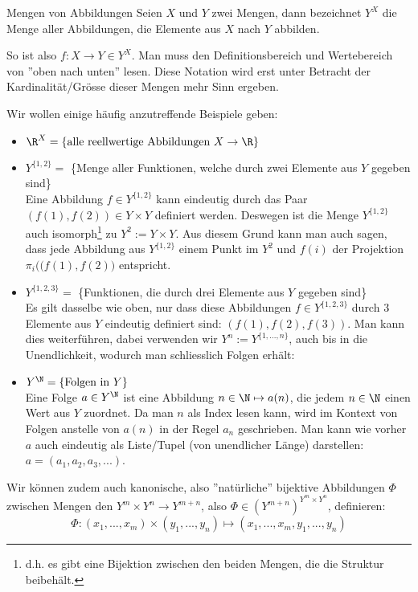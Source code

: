 \begin{definition}{Mengen von Abbildungen}{}
Seien $X$ und $Y$ zwei Mengen, dann bezeichnet $Y^X$ die Menge aller Abbildungen, die Elemente aus $X$ nach $Y$ abbilden.
\end{definition}
So ist also $f: X \to Y \in Y^X$. Man muss den Definitionsbereich und Wertebereich von ''oben nach unten'' lesen. Diese Notation wird erst unter Betracht der Kardinalität/Grösse dieser Mengen mehr Sinn ergeben.
\begin{example} Wir wollen einige häufig anzutreffende Beispiele geben:
\begin{itemize}
    \item $\R^X = \{\text{alle reellwertige Abbildungen } X \to \R\}$
    \item $Y^{\{1,2\}} =$ \{Menge aller Funktionen, welche durch zwei Elemente aus $Y$ gegeben sind\}\\
    Eine Abbildung $f \in Y^{\{1,2\}}$ kann eindeutig durch das Paar $(f(1), f(2)) \in Y \times Y$ definiert werden. Deswegen ist die Menge $Y^{\{1,2\}}$ auch isomorph\footnote{d.h. es gibt eine Bijektion zwischen den beiden Mengen, die die Struktur beibehält.} zu $Y^2 := Y\times Y$. Aus diesem Grund kann man auch sagen, dass jede Abbildung aus $Y^{\{1,2\}}$ einem Punkt im $Y^2$ und $f(i)$ der Projektion $\pi_i\big((f(1), f(2)\big)$ entspricht. 
     \item $Y^{\{1,2,3\}} =$ \{Funktionen, die durch drei Elemente aus $Y$ gegeben sind\}\\
    Es gilt dasselbe wie oben, nur dass diese Abbildungen $f \in Y^{\{1,2,3\}}$ durch 3 Elemente aus $Y$ eindeutig definiert sind: $(f(1), f(2), f(3))$. Man kann dies weiterführen, dabei verwenden wir $Y^n := Y^{\{1,...,n\}}$, auch bis in die Unendlichkeit, wodurch man schliesslich Folgen erhält:
    \item $Y^\N = \{\text{Folgen in } Y\}$\\
    Eine Folge $a \in Y^\N$ ist eine Abbildung $n \in \N \mapsto a(n)$, die jedem $n \in \N$ einen Wert aus $Y$ zuordnet. Da man $n$ als Index lesen kann, wird im Kontext von Folgen anstelle von $a(n)$ in der Regel $a_n$ geschrieben. Man kann wie vorher $a$ auch eindeutig als Liste/Tupel (von unendlicher Länge) darstellen: $a = (a_1, a_2, a_3, ...)$.
\end{itemize}
\end{example}

\begin{example} Wir können zudem auch kanonische, also ''natürliche'' bijektive Abbildungen $\Phi$ zwischen Mengen den $Y^m \times Y^n \to Y^{m+n}$, also $\Phi \in (Y^{m+n})^{Y^m \times Y^n}$, definieren:
$$\Phi: (x_1,...,x_m) \times (y_1, ..., y_n) \mapsto (x_1,...,x_m, y_1, ..., y_n)$$
\end{example}

